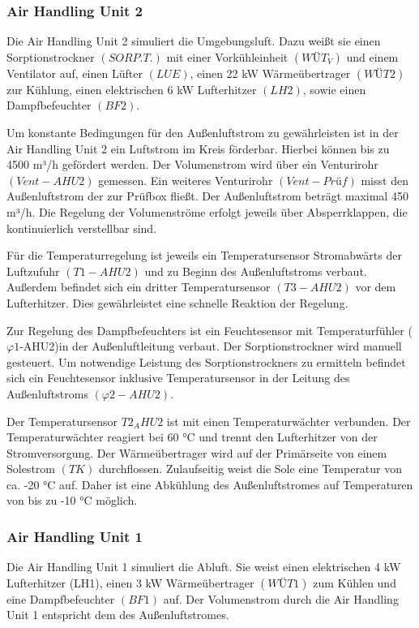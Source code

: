 \subsubsection{Air Handling Unit 2}
\label{Air Handling Unit 2}

Die Air Handling Unit 2 simuliert die Umgebungsluft. Dazu weißt sie einen Sorptionstrockner $(SORP.T.)$ mit einer Vorkühleinheit $(WÜT_{V})$ und einem Ventilator auf, einen Lüfter $(LUE)$, einen 22 kW Wärmeübertrager $(WÜT2)$ zur Kühlung, einen elektrischen 6 kW Lufterhitzer $(LH2)$, sowie einen Dampfbefeuchter $(BF2)$. 

Um konstante Bedingungen für den Außenluftstrom zu gewährleisten ist in der Air Handling Unit 2 ein Luftstrom im Kreis förderbar. Hierbei können bis zu 4500 m³/h gefördert werden. 
Der Volumenstrom wird über ein Venturirohr $(Vent-AHU2)$ gemessen. Ein weiteres Venturirohr $(Vent-Prüf)$ misst den Außenluftstrom der zur Prüfbox fließt. Der Außenluftstrom beträgt maximal 450 m³/h. Die Regelung der Volumenströme erfolgt jeweils über Absperrklappen, die kontinuierlich verstellbar sind. 

Für die Temperaturregelung ist jeweils ein Temperatursensor Stromabwärts der Luftzufuhr $(T1-AHU2)$ und zu Beginn des Außenluftstroms verbaut. Außerdem befindet sich ein dritter Temperatursensor $(T3-AHU2)$ vor dem Lufterhitzer. Dies gewährleistet eine schnelle Reaktion der Regelung.

Zur Regelung des Dampfbefeuchters ist ein Feuchtesensor mit Temperaturfühler ($\varphi1$-AHU2)in der Außenluftleitung verbaut. Der Sorptionstrockner wird manuell gesteuert. Um notwendige Leistung des Sorptionstrockners zu ermitteln befindet sich ein Feuchtesensor inklusive Temperatursensor in der Leitung des Außenluftstroms $(\varphi2-AHU2)$.

Der Temperatursensor $T2_AHU2$ ist mit einen Temperaturwächter verbunden. Der Temperaturwächter reagiert bei 60 °C und trennt den Lufterhitzer von der Stromversorgung.
Der Wärmeübertrager wird auf der Primärseite von einem Solestrom $(TK)$ durchflossen. Zulaufseitig weist die Sole eine Temperatur von ca. -20 °C auf. Daher ist eine Abkühlung des Außenluftstromes auf Temperaturen von bis zu -10 °C möglich. 


\subsubsection{Air Handling Unit 1}
\label{Air Handling Unit 1}
 
Die Air Handling Unit 1 simuliert die Abluft. Sie weist einen elektrischen 4 kW Lufterhitzer (LH1), einen 3 kW Wärmeübertrager $(WÜT1)$ zum Kühlen und eine Dampfbefeuchter $(BF1)$ auf. Der Volumenstrom durch die Air Handling Unit 1 entspricht dem des Außenluftstromes. 

